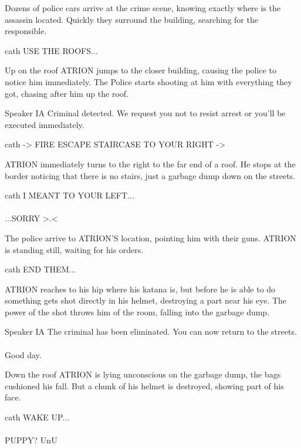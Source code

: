 \documentclass{screenplay}
\begin{document}
Dozens of police cars arrive at the crime scene, knowing exactly where is the assassin located. Quickly they surround the building, searching for the responsible.

\begin{dialogue}{cath}
USE THE ROOFS...
\end{dialogue}
Up on the roof ATRION jumps to the closer building, causing the police to notice him immediately. The Police starts shooting at him with everything they got, chasing after him up the roof.

\begin{dialogue}{Speaker IA}
Criminal detected. We request you not to resist arrest or you'll be executed immediately.
\end{dialogue}
\begin{dialogue}{cath}
-> FIRE ESCAPE STAIRCASE TO YOUR RIGHT ->
\end{dialogue}
ATRION immediately turns to the right to the far end of a roof. He stops at the border noticing that there is no stairs, just a garbage dump down on the streets.

\begin{dialogue}{cath}
I MEANT TO YOUR LEFT... \\~\\
...SORRY >.<
\end{dialogue}

The police arrive to ATRION'S location, pointing him with their guns. ATRION is standing still, waiting for his orders.

\begin{dialogue}{cath}
END THEM...
\end{dialogue}

ATRION reaches to his hip where his katana is, but before he is able to do something gets shot directly in his helmet, destroying a part near his eye. The power of the shot throws him of the room, falling into the garbage dump.
 
\begin{dialogue}{Speaker IA}
The criminal has been eliminated. You can now return to the streets.\\~\\
Good day.
\end{dialogue} 
 
Down the roof ATRION is lying unconscious on the garbage dump, the bags cushioned his fall. But a chunk of his helmet is destroyed, showing part of his face. 

\begin{dialogue}{cath}
WAKE UP... \\~\\
PUPPY? UnU
\end{dialogue}
\end{document}
